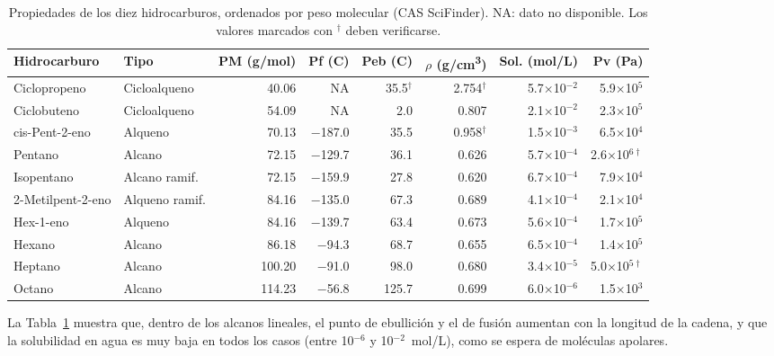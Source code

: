 \documentclass[twoside,twocolumn,10pt]{article}
\begin{document}
\begin{table}[!t]
	\centering
	\caption{Propiedades de los diez hidrocarburos, ordenados por peso molecular (CAS SciFinder). NA: dato no disponible. Los valores marcados con $^\dagger$ deben verificarse.}
	\label{tab:sustancias}
	\begin{tabular}{llrrrrrr}
		\toprule
		\textbf{Hidrocarburo} & \textbf{Tipo} & \textbf{PM (g/mol)} & \textbf{Pf (\textdegree C)} & \textbf{Peb (\textdegree C)} & \textbf{$\rho$ (g/cm\textsuperscript{3})} & \textbf{Sol. (mol/L)} & \textbf{Pv (Pa)} \\
		\midrule
		Ciclopropeno & Cicloalqueno & 40.06 & NA & 35.5$^\dagger$ & 2.754$^\dagger$ & 5.7$\times$10$^{-2}$ & 5.9$\times$10$^{5}$ \\
		Ciclobuteno & Cicloalqueno & 54.09 & NA & 2.0 & 0.807 & 2.1$\times$10$^{-2}$ & 2.3$\times$10$^{5}$ \\
		cis-Pent-2-eno & Alqueno & 70.13 & $-$187.0 & 35.5 & 0.958$^\dagger$ & 1.5$\times$10$^{-3}$ & 6.5$\times$10$^{4}$ \\
		Pentano & Alcano & 72.15 & $-$129.7 & 36.1 & 0.626 & 5.7$\times$10$^{-4}$ & 2.6$\times$10$^{6\dagger}$ \\
		Isopentano & Alcano ramif. & 72.15 & $-$159.9 & 27.8 & 0.620 & 6.7$\times$10$^{-4}$ & 7.9$\times$10$^{4}$ \\
		2-Metilpent-2-eno & Alqueno ramif. & 84.16 & $-$135.0 & 67.3 & 0.689 & 4.1$\times$10$^{-4}$ & 2.1$\times$10$^{4}$ \\
		Hex-1-eno & Alqueno & 84.16 & $-$139.7 & 63.4 & 0.673 & 5.6$\times$10$^{-4}$ & 1.7$\times$10$^{5}$ \\
		Hexano & Alcano & 86.18 & $-$94.3 & 68.7 & 0.655 & 6.5$\times$10$^{-4}$ & 1.4$\times$10$^{5}$ \\
		Heptano & Alcano & 100.20 & $-$91.0 & 98.0 & 0.680 & 3.4$\times$10$^{-5}$ & 5.0$\times$10$^{5\dagger}$ \\
		Octano & Alcano & 114.23 & $-$56.8 & 125.7 & 0.699 & 6.0$\times$10$^{-6}$ & 1.5$\times$10$^{3}$ \\
		\bottomrule
	\end{tabular}
\end{table}

La Tabla~\ref{tab:sustancias} muestra que, dentro de los alcanos lineales, el punto de ebullición y el de fusión aumentan con la longitud de la cadena, y que la solubilidad en agua es muy baja en todos los casos (entre 10$^{-6}$ y 10$^{-2}$~mol/L), como se espera de moléculas apolares.
\end{document}

